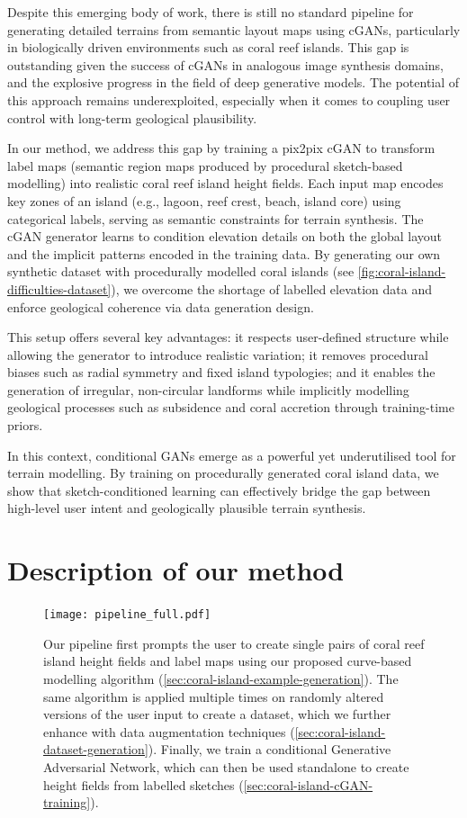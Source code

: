 Despite this emerging body of work, there is still no standard pipeline for generating detailed terrains from semantic layout maps using cGANs, particularly in biologically driven environments such as coral reef islands. This gap is outstanding given the success of cGANs in analogous image synthesis domains, and the explosive progress in the field of deep generative models. The potential of this approach remains underexploited, especially when it comes to coupling user control with long-term geological plausibility.

\midConclusion

In our method, we address this gap by training a pix2pix cGAN to transform label maps (semantic region maps produced by procedural sketch-based modelling) into realistic coral reef island height fields. Each input map encodes key zones of an island (e.g., lagoon, reef crest, beach, island core) using categorical labels, serving as semantic constraints for terrain synthesis. The cGAN generator learns to condition elevation details on both the global layout and the implicit patterns encoded in the training data. By generating our own synthetic dataset with procedurally modelled coral islands (see \cref{fig:coral-island-difficulties-dataset}), we overcome the shortage of labelled elevation data and enforce geological coherence via data generation design.

This setup offers several key advantages: it respects user-defined structure while allowing the generator to introduce realistic variation; it removes procedural biases such as radial symmetry and fixed island typologies; and it enables the generation of irregular, non-circular landforms while implicitly modelling geological processes such as subsidence and coral accretion through training-time priors.

In this context, conditional GANs emerge as a powerful yet underutilised tool for terrain modelling. By training on procedurally generated coral island data, we show that sketch-conditioned learning can effectively bridge the gap between high-level user intent and geologically plausible terrain synthesis.




\section{Description of our method}
\label{sec:coral-island-method-description}

\begin{figure}[H]
\texttt{[image: pipeline\_full.pdf]}
\caption{Our pipeline first prompts the user to create single pairs of coral reef island height fields and label maps using our proposed curve-based modelling algorithm (\cref{sec:coral-island-example-generation}). The same algorithm is applied multiple times on randomly altered versions of the user input to create a dataset, which we further enhance with data augmentation techniques (\cref{sec:coral-island-dataset-generation}). Finally, we train a conditional Generative Adversarial Network, which can then be used standalone to create height fields from labelled sketches (\cref{sec:coral-island-cGAN-training}).}
\label{fig:coral-island-pipeline}
\end{figure}

